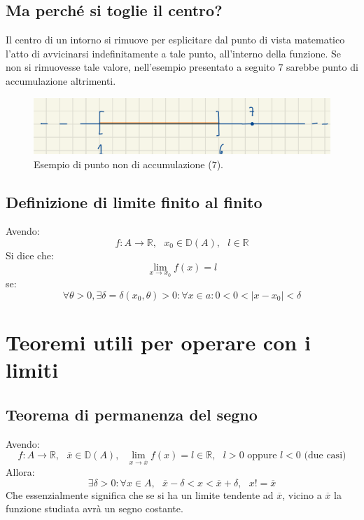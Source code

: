 \documentclass[12pt]{article}
\begin{document}
\subsection{Ma perché si toglie il centro?}
Il centro di un intorno si rimuove per esplicitare dal punto di vista matematico l'atto di avvicinarsi indefinitamente a tale punto, all'interno della funzione. Se non si rimuovesse tale valore, nell'esempio presentato a seguito $7$ sarebbe punto di accumulazione altrimenti.
\begin{figure}[!htb]
    \centering
    \includegraphics[width=1\textwidth, height=.7\textheight,keepaspectratio]{lezione_7/rimozione_centro_intorno.png}
    \begin{center}
        \caption{\label{fig:rimozione_centro}Esempio di punto non di accumulazione ($7$).}
    \end{center}
\end{figure}
\subsection{Definizione di limite finito al finito}
Avendo:
\[
    f: A \rightarrow \mathbb{R}, \text{ } x_0 \in \mathbb{D}(A), \text{ } l \in \mathbb{R}
\]
Si dice che:
\[
    \lim_{x \to x_0} f(x) = l
\]
se:
\begin{equation}
    \forall \theta > 0, \exists \delta = \delta(x_0, \theta)>0 : \forall x \in a: 0 <  0 < |x - x_0| < \delta
\end{equation}
\section{Teoremi utili per operare con i limiti}
\subsection{Teorema di permanenza del segno}
Avendo:
\[
    f: A \rightarrow \mathbb{R}, \text{ } \overline{x} \in \mathbb{D}(A), \text{ } \lim_{x \to \overline{x}} f(x) = l \in \mathbb{R}, \text{ } l > 0 \text{ oppure } l < 0 \text{ (due casi)}
\]
Allora:
\begin{equation}
    \exists \delta > 0: \forall x \in A, \text{ } \overline{x} - \delta < x < \overline{x} + \delta, \text{ } x != \overline{x}   \label{teo:permanenza_segno}
\end{equation}
Che essenzialmente significa che se si ha un limite tendente ad $\overline{x}$, vicino a $\overline{x}$ la funzione studiata avrà un segno costante.
\end{document}
